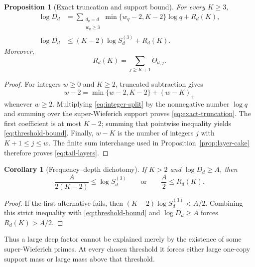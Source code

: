 \documentclass[11pt]{article}
\newtheorem{proposition}[theorem]{Proposition}
\newtheorem{corollary}[theorem]{Corollary}
\theoremstyle{remark}
\begin{document}
\begin{proposition}[Exact truncation and support bound]
\label{prop:truncation}
For every $K\ge3$,
\begin{align}
 \log D_d
 &=\sum_{\substack{d_q=d\\w_q\ge3}}
      \min\{w_q-2,K-2\}\log q+R_d(K),
 \label{eq:exact-truncation}\\
 \log D_d
 &\le (K-2)\log S_d^{(3)}+R_d(K).
 \label{eq:threshold-bound}
\end{align}
Moreover,
\begin{equation}
                    R_d(K)=\sum_{j\ge K+1}\Theta_{d,j}.
 \label{eq:tail-layers}
\end{equation}
\end{proposition}

\begin{proof}
For integers $w\ge0$ and $K\ge2$, truncated subtraction gives
\begin{equation}
 w-2=\min\{w-2,K-2\}+(w-K)_+
 \label{eq:integer-split}
\end{equation}
whenever $w\ge2$.  Multiplying \eqref{eq:integer-split} by the nonnegative
number $\log q$ and summing over the super-Wieferich support proves
\eqref{eq:exact-truncation}.  The first coefficient is at most $K-2$;
summing that pointwise inequality yields \eqref{eq:threshold-bound}.
Finally, $w-K$ is the number of integers $j$ with $K+1\le j\le w$.
The finite sum interchange used in Proposition~\ref{prop:layer-cake}
therefore proves \eqref{eq:tail-layers}.
\end{proof}

\begin{corollary}[Frequency--depth dichotomy]
\label{cor:dichotomy}
If $K>2$ and $\log D_d\ge A$, then
\begin{equation}
 \frac{A}{2(K-2)}\le\log S_d^{(3)}
 \qquad\text{or}\qquad
 \frac A2\le R_d(K).
 \label{eq:dichotomy}
\end{equation}
\end{corollary}

\begin{proof}
If the first alternative fails, then
$(K-2)\log S_d^{(3)}<A/2$.  Combining this strict inequality with
\eqref{eq:threshold-bound} and $\log D_d\ge A$ forces
$R_d(K)>A/2$.
\end{proof}

Thus a large deep factor cannot be explained merely by the existence of
some super-Wieferich primes.  At every chosen threshold it forces either
large one-copy support mass or large mass above that threshold.
\end{document}

